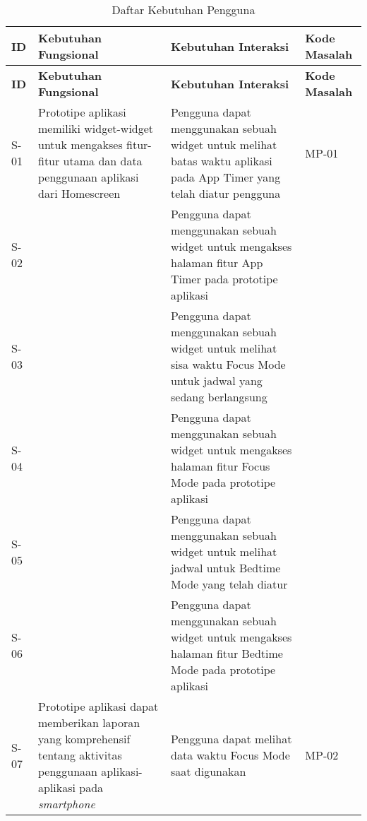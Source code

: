 \RaggedLeft
\begin{small}
\begin{longtable}[c]{|W{c}{0.07\textwidth}|>{\baselineskip=12pt}p{0.3\textwidth}|>{\baselineskip=12pt}p{0.39\textwidth}|>{\centering\arraybackslash\baselineskip=12pt}m{0.11\textwidth}|}
  \caption{Daftar Kebutuhan Pengguna}
  \label{tab:daftar_kebutuhan} \\
  
  \hline {} 
  \textbf{ID}  & \centering\textbf{Kebutuhan Fungsional} & \centering\textbf{Kebutuhan Interaksi} & \textbf{Kode Masalah} \\ \hline \endfirsthead

  \hline {} 
  \textbf{ID}  & \centering\textbf{Kebutuhan Fungsional} & \centering\textbf{Kebutuhan Interaksi} & \textbf{Kode Masalah} \\ \hline \endhead

  \hline \endfoot

  S-01
  & Prototipe aplikasi memiliki widget-widget untuk mengakses fitur-fitur utama dan data penggunaan aplikasi dari Homescreen
  & Pengguna dapat menggunakan sebuah widget untuk melihat batas waktu aplikasi pada App Timer yang telah diatur pengguna
  & MP-01 \\  
  
  S-02 &
  & Pengguna dapat menggunakan sebuah widget untuk mengakses halaman fitur App Timer pada prototipe aplikasi
  & \\  
  
  S-03 &
  & Pengguna dapat menggunakan sebuah widget untuk melihat sisa waktu Focus Mode untuk jadwal yang sedang berlangsung
  & \\  
  
  S-04 &
  & Pengguna dapat menggunakan sebuah widget untuk mengakses halaman fitur Focus Mode pada prototipe aplikasi
  & \\  
  
  S-05 &
  & Pengguna dapat menggunakan sebuah widget untuk melihat jadwal untuk Bedtime Mode yang telah diatur
  & \\  
  
  S-06 &
  & Pengguna dapat menggunakan sebuah widget untuk mengakses halaman fitur Bedtime Mode pada prototipe aplikasi
  & \\ \hline
  S-07
  & Prototipe aplikasi dapat memberikan laporan yang komprehensif tentang aktivitas penggunaan aplikasi-aplikasi pada \textit{smartphone}
  & Pengguna dapat melihat data waktu Focus Mode saat digunakan
  & MP-02 \\  
  

\end{longtable}
\end{small}
